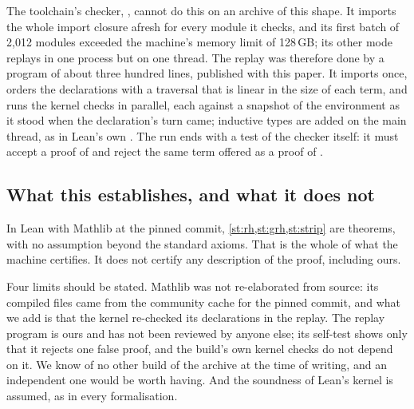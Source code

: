 \replaystatus

The toolchain's checker,  \cite{lean4checker}, cannot do this on an archive of
this shape. It imports the whole import closure afresh for every module it checks, and its
first batch of 2{,}012 modules exceeded the machine's memory limit of 128\,GB; its other mode
replays in one process but on one thread. The replay was therefore done by a program of about
three hundred lines, published with this paper. It imports once, orders the declarations with
a traversal that is linear in the size of each term, and runs the kernel checks in parallel,
each against a snapshot of the environment as it stood when the declaration's turn came;
inductive types are added on the main thread, as in Lean's own . The
run ends with a test of the checker itself: it must accept a proof of  and reject
the same term offered as a proof of .

\subsection{What this establishes, and what it does not}
In Lean \leanversion{} with Mathlib at the pinned commit, \cref{st:rh,st:grh,st:strip} are
theorems, with no assumption beyond the standard axioms. That is the whole of what the machine
certifies. It does not certify any description of the proof, including ours.

Four limits should be stated. Mathlib was not re-elaborated from source: its compiled files
came from the community cache for the pinned commit, and what we add is that the kernel
re-checked its declarations in the replay. The replay program is ours and has not been reviewed
by anyone else; its self-test shows only that it rejects one false proof, and the build's own
kernel checks do not depend on it. We know of no other build of the archive at the time of
writing, and an independent one would be worth having. And the soundness of Lean's kernel is
assumed, as in every formalisation.
